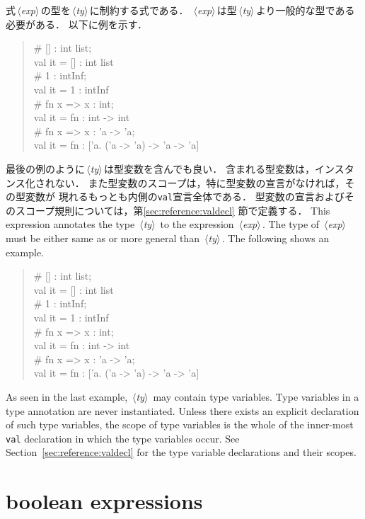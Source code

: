 \documentclass{jbook}
\newcommand{\txt}[2]{#2}
\newcommand{\code}[1]{\mbox{\large\tt #1}}
\newcommand{\nonterm}[1]{\mbox{$\,\langle$}{\it #1}\mbox{$\rangle\,$}}
\newenvironment{program}{\begin{quote}\begin{tt}}%
                        {\end{tt}\end{quote}}
\begin{document}
\ifjp%
	式\nonterm{exp}の型を\nonterm{ty}に制約する式である．
	\nonterm{exp}は型\nonterm{ty}より一般的な型である必要がある．
	以下に例を示す．
\begin{program}
\# [] : int list;
\\
val it = [] : int list
\\
\# 1 : intInf;
\\
val it = 1 : intInf
\\
\# fn x => x : int;
\\
val it = fn : int -> int
\\
\# fn x => x : 'a -> 'a;
\\
val it = fn : ['a. ('a -> 'a) -> 'a -> 'a]
\end{program}
	最後の例のように\nonterm{ty}は型変数を含んでも良い．
	含まれる型変数は，インスタンス化されない．
	また型変数のスコープは，特に型変数の宣言がなければ，その型変数が
現れるもっとも内側の\code{val}宣言全体である．
	型変数の宣言およびそのスコープ規則については，第\ref{sec:reference:valdecl}
節で定義する．
\else%
	This expression annotates the type \nonterm{ty} to
the expression \nonterm{exp}.
	The type of \nonterm{exp} must be either same as or more
general than \nonterm{ty}.
	The following shows an example.
\begin{program}
\# [] : int list;
\\
val it = [] : int list
\\
\# 1 : intInf;
\\
val it = 1 : intInf
\\
\# fn x => x : int;
\\
val it = fn : int -> int
\\
\# fn x => x : 'a -> 'a;
\\
val it = fn : ['a. ('a -> 'a) -> 'a -> 'a]
\end{program}
	As seen in the last example,
\nonterm{ty} may contain type variables.
	Type variables in a type annotation are never instantiated.
	Unless there exists an explicit declaration of such type variables,
the scope of type variables is the whole of the inner-most \code{val}
declaration in which the type variables occur.
	See Section~\ref{sec:reference:valdecl} for the type variable
declarations and their scopes.
\fi%


\section{\txt{論理演算式}{boolean expressions}}
\end{document}
